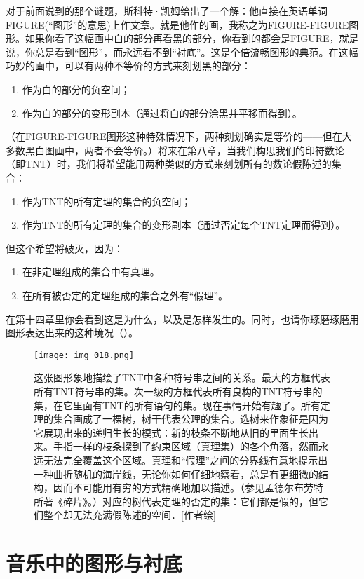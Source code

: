对于前面说到的那个谜题，斯科特·凯姆给出了一个解：他直接在英语单词FIGURE(“图形”的意思)上作文章。就是他作的画，我称之为FIGURE-FIGURE图形。如果你看了这幅画中白的部分再看黑的部分，你看到的都会是FIGURE，就是说，你总是看到“图形”，而永远看不到“衬底”。这是个倍流畅图形的典范。在这幅巧妙的画中，可以有两种不等价的方式来刻划黑的部分：
\begin{enumerate}
\item 作为白的部分的负空间；
\item 作为白的部分的变形副本（通过将白的部分涂黑并平移而得到）。
\end{enumerate}
（在FIGURE-FIGURE图形这种特殊情况下，两种刻划确实是等价的——但在大多数黑白图画中，两者不会等价。）将来在第八章，当我们构思我们的印符数论（即TNT）时，我们将希望能用两种类似的方式来刻划所有的数论假陈述的集合：
\begin{enumerate}
\item 作为TNT的所有定理的集合的负空间；
\item 作为TNT的所有定理的集合的变形副本（通过否定每个TNT定理而得到）。
\end{enumerate}
但这个希望将破灭，因为：
\begin{enumerate}
\item 在非定理组成的集合中有真理。
\item 在所有被否定的定理组成的集合之外有“假理”。
\end{enumerate}
在第十四章里你会看到这是为什么，以及是怎样发生的。同时，也请你琢磨琢磨用图形表达出来的这种境况（）。

\begin{figure}
\texttt{[image: img\_018.png]}
\caption[各类串之间的关系图示。]
  {这张图形象地描绘了TNT中各种符号串之间的关系。最大的方框代表所有TNT符号串的集。次一级的方框代表所有良构的TNT符号串的集，在它里面有TNT的所有语句的集。现在事情开始有趣了。所有定理的集合画成了一棵树，树干代表公理的集合。选树来作象征是因为它展现出来的递归生长的模式：新的枝条不断地从旧的里面生长出来。手指一样的枝条探到了约束区域（真理集）的各个角落，然而永远无法完全覆盖这个区域。真理和“假理”之间的分界线有意地提示出一种曲折随机的海岸线，无论你如何仔细地察看，总是有更细微的结构，因而不可能用有穷的方式精确地加以描述。（参见孟德尔布劳特所著《碎片》。）对应的树代表定理的否定的集：它们都是假的，但它们整个却无法充满假陈述的空间．[作者绘] }
\end{figure}

\section{音乐中的图形与衬底}

